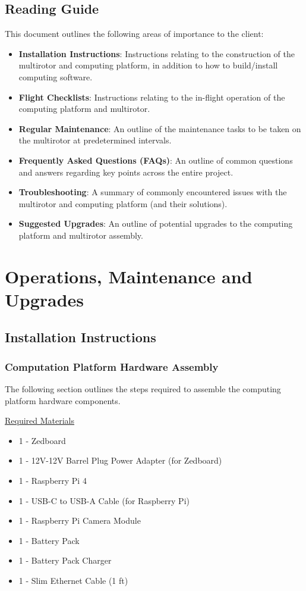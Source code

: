 \documentclass[10pt,letterpaper]{article}
\begin{document}
\subsection{Reading Guide}
This document outlines the following areas of importance to the client: 
\begin{itemize}
\item \textbf{Installation Instructions}: Instructions relating to the construction of the multirotor and computing platform, in addition to how to build/install computing software.
\item \textbf{Flight Checklists}: Instructions relating to the in-flight operation of the computing platform and multirotor.
\item \textbf{Regular Maintenance}: An outline of the maintenance tasks to be taken on the multirotor at predetermined intervals.
\item \textbf{Frequently Asked Questions (FAQs)}: An outline of common questions and answers regarding key points across the entire project.
\item \textbf{Troubleshooting}: A summary of commonly encountered issues with the multirotor and computing platform (and their solutions).
\item \textbf{Suggested Upgrades}: An outline of potential upgrades to the computing platform and multirotor assembly.
\end{itemize}

\clearpage
\section{Operations, Maintenance and Upgrades}
\subsection{Installation Instructions}
\subsubsection{Computation Platform Hardware Assembly}
The following section outlines the steps required to assemble the computing platform hardware components.

\underline{Required Materials}
\begin{itemize}
\item 1 - Zedboard
\item 1 - 12V-12V Barrel Plug Power Adapter (for Zedboard)
\item 1 - Raspberry Pi 4
\item 1 - USB-C to USB-A Cable (for Raspberry Pi)
\item 1 - Raspberry Pi Camera Module
\item 1 - Battery Pack
\item 1 - Battery Pack Charger
\item 1 - Slim Ethernet Cable (1 ft)
\end{itemize}
\end{document}
